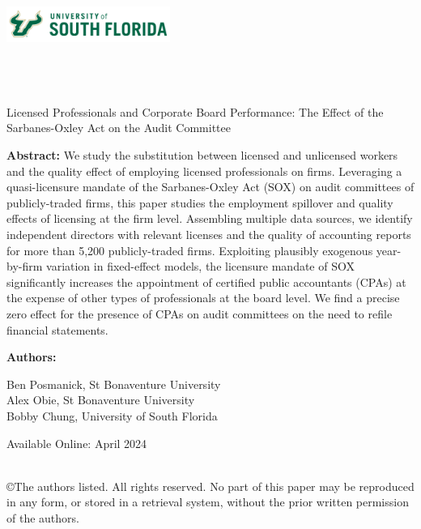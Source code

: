 \documentclass[11pt]{article}
\begin{document}
\onehalfspacing

\noindent \includegraphics[width = 0.4\textwidth]{USouthFlorida-lightbg-2c-rgb-h.png} \\

\noindent{\color{usfgreen} \rule{0.5\textwidth}{10pt}}{\color{usfgold} \rule{0.5\textwidth}{10pt}}\\

 \\
 \\

\vspace*{0.5in}

\begin{center} 
    \huge Licensed Professionals and Corporate Board Performance: The Effect of the Sarbanes-Oxley Act on the Audit Committee
\end{center}

\vspace*{0.5in}

\noindent \textbf{Abstract:} We study the substitution between licensed and unlicensed workers and the quality effect of employing licensed professionals on firms. Leveraging a quasi-licensure mandate of the Sarbanes-Oxley Act (SOX) on audit committees of publicly-traded firms, this paper studies the employment spillover and quality effects of licensing at the firm level. Assembling multiple data sources, we identify independent directors with relevant licenses and the quality of accounting reports for more than 5,200 publicly-traded firms. Exploiting plausibly exogenous year-by-firm variation in fixed-effect models, the licensure mandate of SOX significantly increases the appointment of certified public accountants (CPAs) at the expense of other types of professionals at the board level. We find a precise zero effect for the presence of CPAs on audit committees on the need to refile financial statements.

\vspace*{0.25in}

\noindent \textbf{Authors:}

Ben Posmanick, St Bonaventure University \\
\indent Alex Obie, St Bonaventure University \\
\indent Bobby Chung, University of South Florida \\

\vspace*{0.25in}


\noindent Available Online: April 2024 %

\vfill 
\noindent{\color{usfgreen} \rule{\textwidth}{5pt}}\\
\noindent \small ©The authors listed. All rights reserved. No part of this paper may be reproduced in any form, or stored in a retrieval system, without the prior written permission of the authors.
\thispagestyle{empty}
\end{document}
